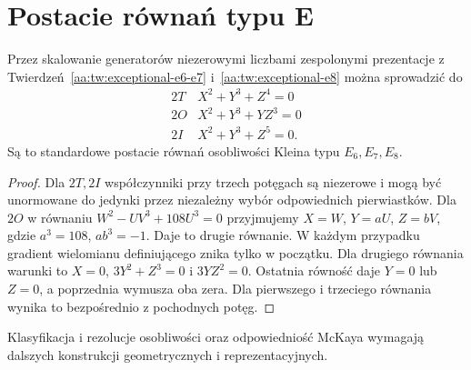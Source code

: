 \section{Postacie równań typu E}

\begin{wniosek}
\label{aa:wn:exceptional-ade}
Przez skalowanie generatorów niezerowymi liczbami
zespolonymi prezentacje z
Twierdzeń~\ref{aa:tw:exceptional-e6-e7}
i~\ref{aa:tw:exceptional-e8} można sprowadzić do
\[
\begin{array}{c|l}
 2T & X^2+Y^3+Z^4=0\\
 2O & X^2+Y^3+YZ^3=0\\
 2I & X^2+Y^3+Z^5=0 .
\end{array}
\]
Są to standardowe postacie równań osobliwości
Kleina typu $E_6,E_7,E_8$.
\end{wniosek}
\begin{proof}
Dla $2T,2I$ współczynniki przy trzech potęgach
są niezerowe i mogą być unormowane do jedynki
przez niezależny wybór odpowiednich pierwiastków.
Dla $2O$ w równaniu $W^2-UV^3+108U^3=0$
przyjmujemy $X=W$, $Y=aU$, $Z=bV$,
gdzie $a^3=108$, $ab^3=-1$.
Daje to drugie równanie. W każdym przypadku
gradient wielomianu definiującego znika tylko
w początku. Dla drugiego równania warunki to
$X=0$, $3Y^2+Z^3=0$ i $3YZ^2=0$.
Ostatnia równość daje $Y=0$ lub $Z=0$,
a poprzednia wymusza oba zera. Dla pierwszego
i trzeciego równania wynika to bezpośrednio
z pochodnych potęg.
\end{proof}

Klasyfikacja i rezolucje osobliwości oraz odpowiedniość McKaya
wymagają dalszych konstrukcji geometrycznych i reprezentacyjnych.
